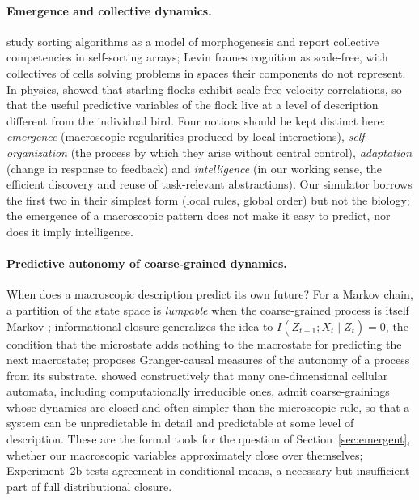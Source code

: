 \documentclass[11pt,a4paper]{article}
\begin{document}
\paragraph{Emergence and collective dynamics.}
\citet{zhang2025} study sorting algorithms as a model of morphogenesis and
report collective competencies in self-sorting arrays; Levin
\citep{levin2019,levin2022} frames cognition as scale-free, with collectives of
cells solving problems in spaces their components do not represent. In
physics, \citet{cavagna2010} showed that starling flocks exhibit scale-free
velocity correlations, so that the useful predictive variables of the flock
live at a level of description different from the individual bird. Four
notions should be kept distinct here: \emph{emergence} (macroscopic
regularities produced by local interactions), \emph{self-organization} (the
process by which they arise without central control), \emph{adaptation}
(change in response to feedback) and \emph{intelligence} (in our working
sense, the efficient discovery and reuse of task-relevant abstractions). Our
simulator borrows the first two in their simplest form (local rules, global
order) but not the biology; the emergence of a macroscopic pattern does not
make it easy to predict, nor does it imply intelligence.

\paragraph{Predictive autonomy of coarse-grained dynamics.}
When does a macroscopic description predict its own future? For a Markov
chain, a partition of the state space is \emph{lumpable} when the
coarse-grained process is itself Markov \citep{kemeny1976}; informational
closure \citep{pfante2014} generalizes the idea to $I(Z_{t+1};X_t\mid Z_t)=0$,
the condition that the microstate adds nothing to the macrostate for
predicting the next macrostate; \citet{seth2010} proposes Granger-causal
measures of the autonomy of a process from its substrate.
\citet{israeli2006} showed constructively that many one-dimensional cellular
automata, including computationally irreducible ones, admit coarse-grainings
whose dynamics are closed and often simpler than the microscopic rule, so that
a system can be unpredictable in detail and predictable at some level of
description. These are the formal tools for the question of
Section~\ref{sec:emergent}, whether our macroscopic variables approximately
close over themselves; Experiment~2b tests agreement in conditional means, a necessary but
insufficient part of full distributional closure.
\end{document}
